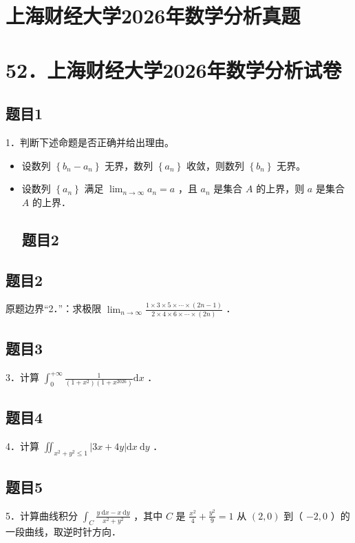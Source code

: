 \documentclass{article}
\begin{document}
\section*{上海财经大学2026年数学分析真题}
\section*{52．上海财经大学2026年数学分析试卷}

\subsection{题目1}
1．判断下述命题是否正确并给出理由。

\begin{itemize}
  \item[（1）] 设数列 \(\left\{b_{n}-a_{n}\right\}\) 无界，数列 \(\left\{a_{n}\right\}\) 收敛，则数列 \(\left\{b_{n}\right\}\) 无界。
  \item[（2）] 设数列 \(\left\{a_{n}\right\}\) 满足 \(\lim _{n \rightarrow \infty} a_{n}=a\) ，且 \(a_{n}\) 是集合 \(A\) 的上界，则 \(a\) 是集合 \(A\) 的上界．

\subsection{题目2}
\end{itemize}

\subsection{题目2}
原题边界“2．”：求极限 \(\lim _{n \rightarrow \infty} \frac{1 \times 3 \times 5 \times \cdots \times(2 n-1)}{2 \times 4 \times 6 \times \cdots \times(2 n)}\) ．

\subsection{题目3}
3．计算 \(\int_{0}^{+\infty} \frac{1}{\left(1+x^{2}\right)\left(1+x^{2026}\right)} \mathrm{d} x\) ．

\subsection{题目4}
4．计算 \(\iint_{x^{2}+y^{2} \leq 1}|3 x+4 y| \mathrm{d} x \mathrm{~d} y\) ．

\subsection{题目5}
5．计算曲线积分 \(\int_{C} \frac{y \mathrm{~d} x-x \mathrm{~d} y}{x^{2}+y^{2}}\) ，其中 \(C\) 是 \(\frac{x^{2}}{4}+\frac{y^{2}}{9}=1\) 从 \((2,0)\) 到（ \(-2,0\) ）的一段曲线，取逆时针方向．
\end{document}
